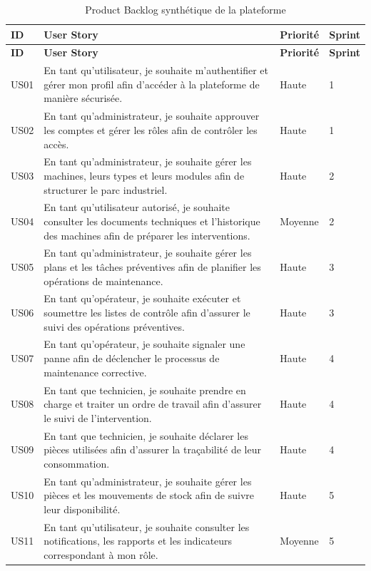 \begin{longtable}{|p{0.9cm}|p{9.4cm}|p{1.5cm}|p{1.2cm}|}
\caption{Product Backlog synthétique de la plateforme}
\label{tab:product-backlog}\\
\hline
\textbf{ID} & \textbf{User Story} & \textbf{Priorité} & \textbf{Sprint} \\
\hline
\endfirsthead
\hline
\textbf{ID} & \textbf{User Story} & \textbf{Priorité} & \textbf{Sprint} \\
\hline
\endhead
US01 & En tant qu’utilisateur, je souhaite m’authentifier et gérer mon profil afin d’accéder à la plateforme de manière sécurisée. & Haute & 1 \\
\hline
US02 & En tant qu’administrateur, je souhaite approuver les comptes et gérer les rôles afin de contrôler les accès. & Haute & 1 \\
\hline
US03 & En tant qu’administrateur, je souhaite gérer les machines, leurs types et leurs modules afin de structurer le parc industriel. & Haute & 2 \\
\hline
US04 & En tant qu’utilisateur autorisé, je souhaite consulter les documents techniques et l’historique des machines afin de préparer les interventions. & Moyenne & 2 \\
\hline
US05 & En tant qu’administrateur, je souhaite gérer les plans et les tâches préventives afin de planifier les opérations de maintenance. & Haute & 3 \\
\hline
US06 & En tant qu’opérateur, je souhaite exécuter et soumettre les listes de contrôle afin d’assurer le suivi des opérations préventives. & Haute & 3 \\
\hline
US07 & En tant qu’opérateur, je souhaite signaler une panne afin de déclencher le processus de maintenance corrective. & Haute & 4 \\
\hline
US08 & En tant que technicien, je souhaite prendre en charge et traiter un ordre de travail afin d’assurer le suivi de l’intervention. & Haute & 4 \\
\hline
US09 & En tant que technicien, je souhaite déclarer les pièces utilisées afin d’assurer la traçabilité de leur consommation. & Haute & 4 \\
\hline
US10 & En tant qu’administrateur, je souhaite gérer les pièces et les mouvements de stock afin de suivre leur disponibilité. & Haute & 5 \\
\hline
US11 & En tant qu’utilisateur, je souhaite consulter les notifications, les rapports et les indicateurs correspondant à mon rôle. & Moyenne & 5 \\

\end{longtable}

